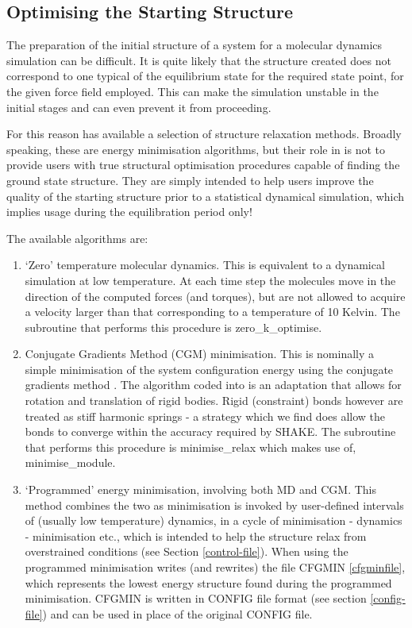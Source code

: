 \subsection{Optimising the Starting Structure} \label{minimisation} 

The preparation of the initial structure of a system for a molecular
dynamics simulation can be difficult.  It is quite likely that the
structure created does not correspond to one typical of the
equilibrium state for the required state point, for the given force
field employed.  This can make the simulation unstable in the initial
stages and can even prevent it from proceeding.

For this reason \D has available a selection of structure relaxation
methods.  Broadly speaking, these are energy minimisation algorithms,
but their role in \D is not to provide users with true structural
optimisation procedures capable of finding the ground state structure.
They are simply intended to help users improve the quality of the
starting structure prior to a statistical dynamical simulation, which
implies usage during the equilibration period only!

The available algorithms are:
\begin{enumerate}
\item `Zero' temperature molecular dynamics.
This is equivalent to a dynamical simulation at low temperature.
At each time step the molecules move in the direction of the
computed forces (and torques), but are not allowed to acquire
a velocity larger than that corresponding to a temperature of 10 Kelvin.
The subroutine that performs this procedure is {\sc zero\_k\_optimise}.

\item Conjugate Gradients Method (CGM) minimisation.
This is nominally a simple minimisation of the system configuration
energy using the conjugate gradients method \cite{shewchuk-94a}.
The algorithm coded into \D is an adaptation that allows for
rotation and translation of rigid bodies. Rigid (constraint) bonds
however are treated as stiff harmonic springs - a strategy which
we find does allow the bonds to converge within the accuracy
required by SHAKE.  The subroutine that performs this procedure
is {\sc minimise\_relax} which makes use of, {\sc minimise\_module}.

\item `Programmed' energy minimisation, involving both MD and CGM.
This method combines the two as minimisation is invoked by
user-defined intervals of (usually low temperature) dynamics, in a
cycle of minimisation - dynamics - minimisation etc., which is
intended to help the structure relax from overstrained conditions
(see Section \ref{control-file}).  When using the programmed
minimisation \D writes (and rewrites) the file CFGMIN \ref{cfgminfile},
which represents the lowest energy structure found during the
programmed minimisation.  CFGMIN is written in CONFIG file format
(see section \ref{config-file}) and can be used in place of the
original CONFIG file.
\end{enumerate}

